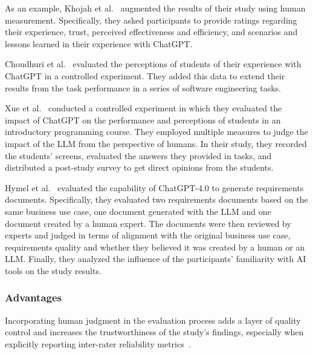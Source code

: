 As an example, Khojah et al.~\cite{DBLP:journals/pacmse/KhojahM0N24} augmented the results of their study using human measurement.
Specifically, they asked participants to provide ratings regarding their experience, trust, perceived effectiveness and efficiency, and scenarios and lessons learned in their experience with ChatGPT.

Choudhuri et al.~\cite{DBLP:conf/icse/ChoudhuriLSGS24} evaluated the perceptions of students of their experience with ChatGPT in a controlled experiment.
They added this data to extend their results from the task performance in a series of software engineering tasks.

Xue et al.~\cite{DBLP:conf/icse/XueCBTH24} conducted a controlled experiment in which they evaluated the impact of ChatGPT on the performance and perceptions of students in an introductory programming course.
They employed multiple measures to judge the impact of the LLM from the perspective of humans.
In their study, they recorded the students' screens, evaluated the answers they provided in tasks, and distributed a post-study survey to get direct opinions from the students.

Hymel et al.~\cite{hymel2025analysisllmsvshuman} evaluated the capability of ChatGPT-4.0 to generate requirements documents. 
Specifically, they evaluated two requirements documents based on the same business use case, one document generated with the LLM and one document created by a human expert.
The documents were then reviewed by experts and judged in terms of alignment with the original business use case, requirements quality and whether they believed it was created by a human or an LLM.
Finally, they analyzed the influence of the participants' familiarity with AI tools on the study results.

\subsubsection{Advantages}

Incorporating human judgment in the evaluation process adds a layer of quality control and increases the trustworthiness of the study's findings, especially when explicitly reporting inter-rater reliability metrics~\cite{Can large language models replace humans in systematic reviews? Evaluating GPT-4's efficacy in screening and extracting data from peer-reviewed and grey literature in multiple languages}.

